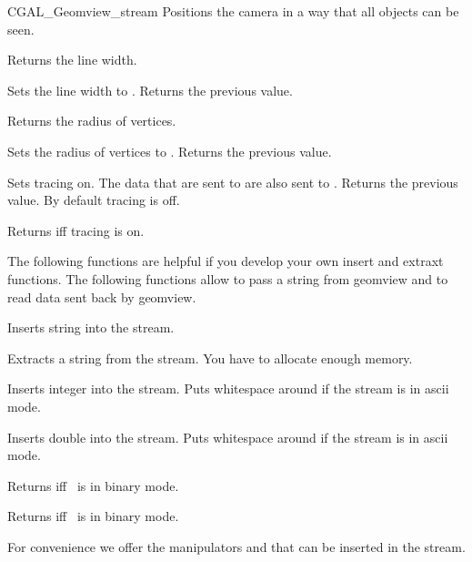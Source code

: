 \begin{ccClass}{CGAL_Geomview_stream}
{Positions the camera in a way that all objects can be seen.}

{Returns the line width.}

{Sets the line width to . Returns the previous value.}

{Returns the radius of vertices.}

{Sets the radius of vertices to . Returns the previous value.}

{Sets tracing on. The data that are sent to  are also
 sent to .  Returns the previous value. By default tracing is
 off.}

{Returns  iff tracing is on.}



The following functions are helpful if you develop your own insert
and extraxt functions. The following functions allow to pass a string
from geomview and to read data sent back by geomview.

{Inserts string  into the stream.}


{Extracts a string  from the stream.
\ccPrecond You have to allocate enough memory.}

{Inserts integer  into the stream. Puts whitespace around if the
stream is in ascii mode.}


{Inserts double  into the stream. Puts whitespace around if the
stream is in ascii mode.}

{Returns  iff \ccVar\ is in binary mode.}

{Returns  iff \ccVar\ is in binary mode.}


For convenience we offer the manipulators  and 
that can be inserted in the stream.


\end{ccClass}
